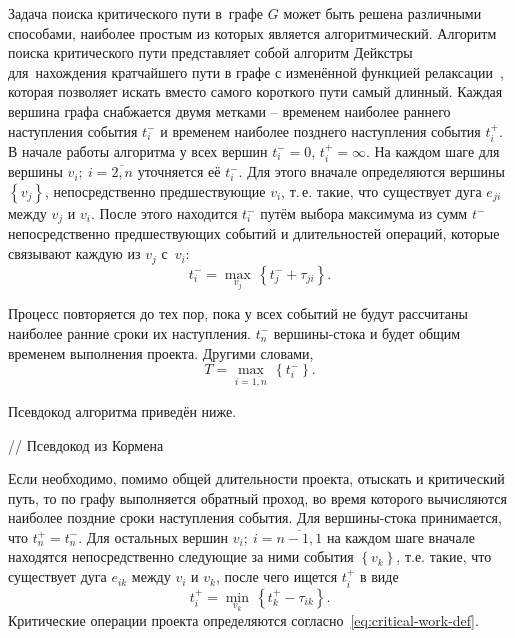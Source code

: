 Задача поиска критического пути в~графе $G$ может быть решена различными способами, наиболее простым из которых является алгоритмический. Алгоритм поиска критического пути представляет собой алгоритм Дейкстры для~нахождения кратчайшего пути в графе с изменённой функцией релаксации~\cite{Kormen, Indians_CPM}, которая позволяет искать вместо самого короткого пути самый длинный. Каждая вершина графа снабжается двумя метками – временем наиболее раннего наступления события $t_{i}^{-}$ и временем наиболее позднего наступления события $t_{i}^{+}$. В начале работы алгоритма у всех вершин $t_{i}^{-}=0$, $t_{i}^{+}=\infty $. На каждом шаге для вершины $v_i;\ i=\overline{2,n}$ уточняется её $t_{i}^{-}$. Для этого вначале определяются вершины $\left\{ v_j \right\}$, непосредственно предшествующие $v_i$, т.\,е. такие, что существует дуга $e_{ji}$ между $v_j$ и $v_i$. После этого находится $t_{i}^{-}$ путём выбора максимума из сумм $t^{-}$ непосредственно предшествующих событий и длительностей операций, которые связывают каждую из $v_j$ с~$v_i$:
\begin{equation}
\label{eq:earliest-event-time}
  t_{i}^{-}=\underset{v_j}{\mathop{\max }}\,\left\{ t_{j}^{-}+\tau_{ji} \right\}.
\end{equation}

Процесс повторяется до тех пор, пока у всех событий не будут рассчитаны наиболее ранние сроки их наступления. $t_{n}^{-}$ вершины-стока и будет общим временем выполнения проекта. Другими словами,
\begin{equation}
\label{eq:total-project-time}
  T=\underset{i=\overline{1,n}}{\mathop{\max }}\,\left\{ t_{i}^{-} \right\}.
\end{equation}

Псевдокод алгоритма приведён ниже.

// Псевдокод из Кормена

Если необходимо, помимо общей длительности проекта, отыскать и критический путь, то по графу выполняется обратный проход, во время которого вычисляются наиболее поздние сроки наступления события. Для вершины-стока принимается, что $t_{n}^{+}=t_{n}^{-}$. Для остальных вершин $v_i;\ i=\overline{n-1,1}$ на каждом шаге вначале находятся непосредственно следующие за ними события $\left\{ v_k \right\}$, т.е. такие, что существует дуга $e_{ik}$ между $v_i$ и $v_k$, после чего ищется $t_{i}^{+}$ в виде
\begin{equation}
\label{eq:latest-event-time}
  t_{i}^{+}=\underset{v_k}{\mathop{\min }}\,\left\{ t_{k}^{+}-{{\tau }_{ik}} \right\}.
\end{equation}
Критические операции проекта определяются согласно~\eqref{eq:critical-work-def}.

